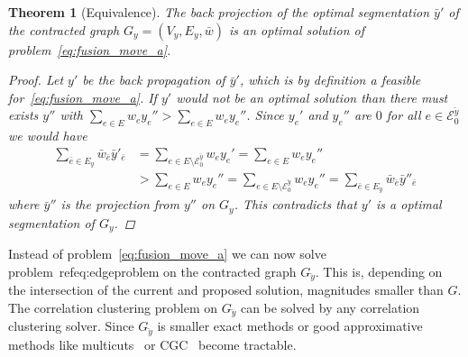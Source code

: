 \documentclass[10pt,twocolumn,letterpaper]{article}
\newtheorem{theorem}{Theorem}
\theoremstyle{definition}
\newtheorem{definition}{Definition}
\begin{document}



\begin{theorem}[Equivalence]\label{thm:Equivalence}
The back projection of the optimal segmentation $\bar{y}'$ of the contracted graph $G_y=(V_y,E_y, \bar{w})$
is an optimal solution of problem~\ref{eq:fusion_move_a}.
\begin{proof}
Let $y'$ be the back propagation of $\bar{y}'$, which is by definition a feasible for~\ref{eq:fusion_move_a}.
If $y'$ would not be an optimal solution than there must exists $y''$ with 
$\sum_{e\in E} w_ey_e'' > \sum_{e\in E} w_ey_e''$.
Since $y_e'$ and $y_e''$ are $0$ for all $e \in \mathcal{E}_0^{\breve{y}}$ we would have
\begin{align*}
  \sum_{\bar{e}\in E_y} \bar{w}_{\bar{e}}\bar{y}'_{\bar{e}}
 &= \sum_{e\in E \setminus \mathcal{E}_0^{\breve{y}}} w_ey_e'          
  = \sum_{e\in E} w_ey_e'' \\
 &> \sum_{e\in E} w_ey_e''
  = \sum_{e\in E \setminus \mathcal{E}_0^{\breve{y}}} w_ey_e''
  =\sum_{\bar{e}\in E_y} \bar{w}_{\bar{e}}\bar{y}''_{\bar{e}}
\end{align*}
where $\bar{y}''$ is the projection from $y''$ on $G_y$.
This contradicts that $y'$ is a optimal segmentation of $G_y$.
\end{proof}
%
\end{theorem}

Instead of problem~\ref{eq:fusion_move_a} we can now solve problem~ref{eq:edgeproblem} on the contracted graph $G_{\breve{y}}$.
This is, depending on the intersection of the current and proposed solution, magnitudes smaller than $G$.
The correlation clustering problem on $G_{\breve{y}}$ can be solved by any correlation clustering solver.
Since $G_{\breve{y}}$ is smaller exact methods or good approximative methods like 
multicuts~\cite{kappes_2013_arxiv} or CGC~\cite{beier_2014_cvpr}
become tractable.
\end{document}
